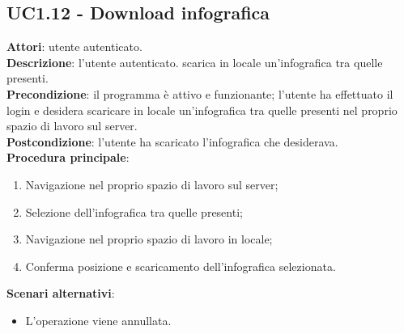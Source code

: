 \subsection{UC1.12 - Download infografica}{
	\label{uc1.12}
	\textbf{Attori}: utente autenticato.\\
	\textbf{Descrizione}: l'utente autenticato. scarica in locale un'infografica tra quelle presenti.\\
	\textbf{Precondizione}: il programma è attivo e funzionante; l'utente ha effettuato il login e desidera scaricare in locale un'infografica tra quelle presenti nel proprio spazio di lavoro sul server.	\\
	\textbf{Postcondizione}: l'utente ha scaricato l'infografica che desiderava.\\
	\textbf{Procedura principale}:
	\begin{enumerate}
		\item Navigazione nel proprio spazio di lavoro sul server;
		\item Selezione dell'infografica tra quelle presenti;
		\item Navigazione nel proprio spazio di lavoro in locale;
		\item Conferma posizione e scaricamento dell'infografica selezionata.
		\end{enumerate}	
	\textbf{Scenari alternativi}:
	\begin{itemize}
		\item L'operazione viene annullata.
	\end{itemize}
	}